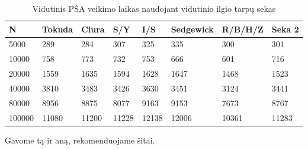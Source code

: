 \documentclass{VUMIFInfKursinis}
\begin{document}
\begin{table}[H]
  \caption{Vidutinis PŠA veikimo laikas naudojant vidutinio ilgio tarpų sekas}
  \begin{tabular}{|l|l|l|l|l|l|l|l|}
  \hline
  N      & Tokuda & Ciura & S/Y   & I/S   & Sedgewick & R/B/H/Z & Seka 2   \\ \hline
  5000   & 289    & 284   & 307   & 325   & 335       & 300     & 301   \\ \hline
  10000  & 758    & 773   & 732   & 753   & 666       & 601     & 716   \\ \hline
  20000  & 1559   & 1635  & 1594  & 1628  & 1647      & 1468    & 1523  \\ \hline
  40000  & 3810   & 3483  & 3426  & 3630  & 3451      & 3124    & 3441  \\ \hline
  80000  & 8956   & 8875  & 8077  & 9163  & 9153      & 7673    & 8767  \\ \hline
  100000 & 11080  & 11200 & 11228 & 12138 & 12006     & 10361   & 11283 \\ \hline
  \end{tabular}
  \end{table}


Gavome tą ir aną, rekomenduojame šitai.

\printbibliography[heading=bibintoc] %

\appendix  %
\end{document}
